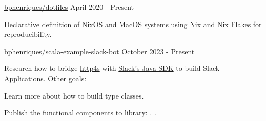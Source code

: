 
\begin{cventries}
  \openSourceEntry
    {\href{https://github.com/bphenriques/dotfiles}{bphenriques/dotfiles}}
    {April 2020 - Present}
    {
    \begin{openSourceDescription}
    Declarative definition of NixOS and MacOS systems using \href{https://nixos.org/}{Nix} and \href{https://nixos.wiki/wiki/Flakes}{Nix Flakes} for reproducibility.
    \end{openSourceDescription}
    \vspace{4mm}
    }

  \vspace{2mm}

\openSourceEntry
    {\href{https://github.com/}{bphenriques/scala-example-slack-bot}}
    {October 2023 - Present}
    {   
    \begin{openSourceDescription}
    Research how to bridge \href{https://github.com/http4s/http4s}{http4s} with \href{https://github.com/slackapi/java-slack-sdk}{Slack's Java SDK} to build Slack Applications. Other goals:
    \end{openSourceDescription}
    \vspace{8mm}
    \begin{openSourceItems}
        \item Learn more about how to build type classes.
        \item Publish the functional components to library:
        .
        .
    \end{openSourceItems}
    \vspace{4mm}
    }

  \vspace{2mm}  


\end{cventries}

